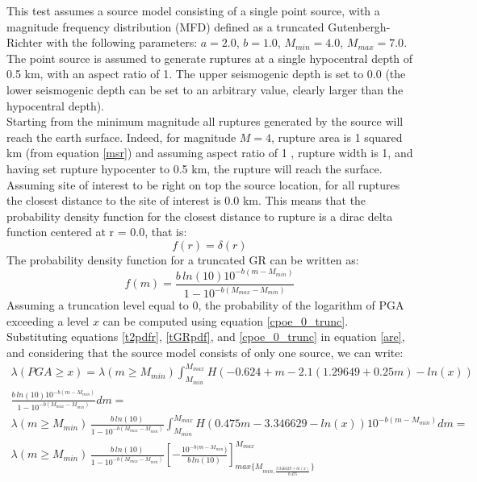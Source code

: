 This test assumes a source model consisting of a single point source, 
with a magnitude frequency distribution (MFD)
defined as a truncated Gutenbergh-Richter with the following parameters:
$a=2.0$, $b=1.0$, $M_{min}=4.0$, $M_{max}=7.0$.
The point source is assumed to generate ruptures at a single hypocentral
depth of 0.5 km, with an aspect ratio of 1.
The upper seismogenic depth is set to 0.0 (the lower seismogenic depth 
can be set to an arbitrary value, clearly larger than the
hypocentral depth).\\
Starting from the minimum magnitude all ruptures generated by the source will
reach the earth surface.  Indeed, for magnitude $M=4$, rupture area is 1 squared
km (from equation \ref{msr}) and assuming aspect ratio of 1 , rupture width is
1, and having set rupture hypocenter to 0.5 km, the rupture will reach the
surface.  Assuming site of interest to be right on top the source location, for
all ruptures the closest distance to the site of interest is 0.0 km. This means
that the probability density function for the closest distance to rupture is a
dirac delta function centered at r = 0.0, that is:
\begin{equation}
\label{t2pdfr}
f(r) = \delta(r)
\end{equation}
The probability density function for a truncated GR can be written as:
\begin{equation}
\label{tGRpdf}
f(m) = \frac{b \,ln(10) 10^{-b(m-M_{min})}}{1 - 10^{-b(M_{max} - M_{min})}}
\end{equation}
Assuming a truncation level equal to 0, the probability of the logarithm of PGA
exceeding a level $x$ can be computed using equation \ref{cpoe_0_trunc}.\\
Substituting equations \ref{t2pdfr}, \ref{tGRpdf}, and \ref{cpoe_0_trunc} in
equation \ref{are}, and considering that the source model consists of only one
source, we can write:
\begin{eqnarray}
    \label{aret2}
    \lambda(PGA \geq x) =  \lambda(m\geq M_{min}) \int_{M_{min}}^{M_{max}} H(-0.624 + m - 2.1 (1.29649 + 0.25 m) - ln(x)) \nonumber \\
    \frac{b \,ln(10) 10^{-b(m-M_{min})}}{1 - 10^{-b(M_{max} - M_{min})}} dm =\nonumber \\
     \lambda(m\geq M_{min})\, \frac{b \,ln(10)}{1 - 10^{-b(M_{max} - M_{min})}} \int_{M_{min}}^{M_{max}} H(0.475m - 3.346629 - ln(x)) 10^{-b(m-M_{min})} dm =\nonumber \\
      \lambda(m\geq M_{min})\, \frac{b \,ln(10)}{1 - 10^{-b(M_{max} - M_{min})}} \left[ -\frac{10^{-b(m - M_{min}})}{b\,ln(10)} \right]_{max\{ M_{min, \frac{3.346629 + ln(x)}{0.475}} \}}^{M_{max}}
\end{eqnarray}
